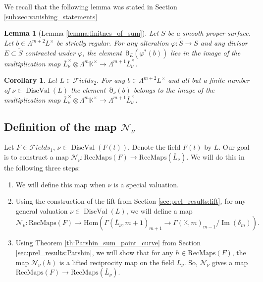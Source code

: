 \documentclass[12pt]{extarticle}
\newtheorem{lemma}[theorem]{Lemma}
\newtheorem{corollary}[theorem]{Corollary}
\newtheorem{remark}[theorem]{Remark}
\def\mb{\mathbb}
\def\mc{\mathcal}
\def\k{\mb K}
\def\ph{\varphi}
\def\N{\mc N}
\def\oL{\ol L}
\def\t{\times}
\def\ol{\overline}
\def\wt{\widetilde}
\def\F{{\mc Fields}}
\newcommand{\SRL}{\mathrm{RecMaps}}
\newcommand{\Hom}{\mathrm{Hom}}
\DeclareMathOperator{\ts}{\partial}
\DeclareMathOperator{\im}{Im}
\DeclareMathOperator{\dval}{DiscVal}
\begin{document}

We recall that the following lemma was stated in Section \ref{sub:sec:vanishing_statements}

\begin{lemma}[Lemma \ref{lemma:finitnes_of_sum}]
Let $S$ be a smooth proper surface. Let $b\in \Lambda^{m+2} L^\t$ be strictly regular. For any alteration $\ph\colon \wt S\to S$ and any divisor $E\subset \wt S$ contracted under $\ph$, the element $\ts_E(\ph^*(b))$ lies in the image of the multiplication map $\overline L_\nu^\t\otimes \Lambda^m \k^\t\to \Lambda^{m+1}\overline L_\nu^\t$.
\end{lemma}


\begin{corollary}
\label{cor:finitnes_of_sum}
    Let $L\in\F_2$. For any $b\in \Lambda^{m+2} L^\t$ and all but a finite number of $\nu\in \dval(L)$ the element $\ts_\nu(b)$ belongs to the image of the multiplication map $\overline L_\nu^\t\otimes \Lambda^m \k^\t\to \Lambda^{m+1}\overline L_\nu^\t$.
\end{corollary}


\subsection{Definition of the map $\mc N_\nu$}

Let $F\in \F_1$, $\nu\in\dval(F(t))$. Denote the field $F(t)$ by $L$. Our goal is to construct a map $\N_\nu\colon \SRL(F)\to \SRL(\oL_\nu)$. We will do this in the following three steps:

\begin{enumerate}
    \item We will define this map when $\nu$ is a special valuation.
    \item Using the construction of the lift from Section \ref{sec:prel_results:lift}, for any general valuation $\nu\in\dval(L)$, we will define a map $$\N_\nu\colon \SRL(F)\to \Hom(\Gamma(\ol L_\nu, m+1)_{m+1}\to \Gamma(\k,m)_{m-1}/\im(\delta_m)).$$
    \item Using Theorem \ref{th:Parshin_sum_point_curve} from Section \ref{sec:prel_results:Parshin}, we will show that for any $h\in\SRL(F)$, the map $\N_\nu(h)$ is a lifted reciprocity map on the field $\oL_\nu$. So, $\N_\nu$ gives a map $\SRL(F)\to \SRL(\ol{L}_\nu)$.
\end{enumerate}
\end{document}
